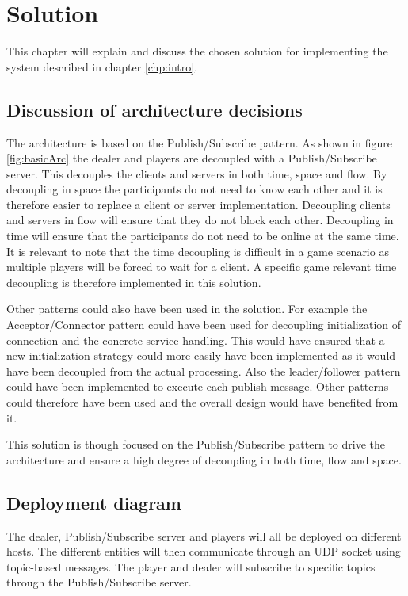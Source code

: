 \chapter{Solution}
This chapter will explain and discuss the chosen solution for implementing the system described in chapter \ref{chp:intro}.

\section{Discussion of architecture decisions}
The architecture is based on the Publish/Subscribe pattern. As shown in figure \ref{fig:basicArc} the dealer and players are decoupled with a Publish/Subscribe server. This decouples the clients and servers in both time, space and flow. By decoupling in space the participants do not need to know each other and it is therefore easier to replace a client or server implementation. Decoupling clients and servers in flow will ensure that they do not block each other. Decoupling in time will ensure that the participants do not need to be online at the same time. It is relevant to note that the time decoupling is difficult in a game scenario as multiple players will be forced to wait for a client. A specific game relevant time decoupling is therefore implemented in this solution.

Other patterns could also have been used in the solution. For example the Acceptor/Connector pattern could have been used for decoupling initialization of connection and the concrete service handling. This would have ensured that a new initialization strategy could more easily have been implemented as it would have been decoupled from the actual processing. Also the leader/follower pattern could have been implemented to execute each publish message. Other patterns could therefore have been used and the overall design would have benefited from it.

This solution is though focused on the Publish/Subscribe pattern to drive the architecture and ensure a high degree of decoupling in both time, flow and space. 

\section{Deployment diagram}
The dealer, Publish/Subscribe server and players will all be deployed on different hosts. The different entities will then communicate through an UDP socket using topic-based messages. The player and dealer will subscribe to specific topics through the Publish/Subscribe server.

